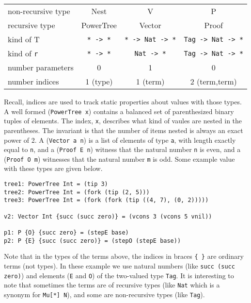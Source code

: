 \vspace*{0.1in}
\begin{tabular}{l|c|c|c}
non-recursive type & Nest          & V                    & P                       \\
recursive type     & PowerTree     & Vector               & Proof                   \\ \hline
kind of T          & \verb+* -> *+ & \verb+* -> Nat -> *+ & \verb+Tag -> Nat -> *+  \\ 
kind of \verb+r+   &  \verb+* -> *+ & \verb+Nat -> *+     & \verb+Tag -> Nat -> *+  \\
number parameters  & 0             & 1                    & 0                       \\ 
number indices     & 1 (type)      & 1 (term)             & 2 (term,term)           \\ 

\end{tabular}

\vspace*{0.1in}
Recall, indices are used to track static properties about values
with those types. A well formed (\verb+PowerTree x+) contains a balanced
set of parenthesized binary tuples of elements. The index, \verb+x+,  describes
what kind of vaules are nested in the parentheses. The invariant is that the
number of items nested is always an exact power of 2. A (\verb+Vector a n+) is a list of elements of
type \verb+a+, with length exactly equal to \verb+n+, and a (\verb+Proof E n+) witness that
the natural number \verb+n+ is even, and a (\verb+Proof O m+) witnesses
that the natural number \verb+m+ is odd. Some example value with these types are
given below.

{\small
\begin{verbatim}
tree1: PowerTree Int = (tip 3)
tree2: PowerTree Int = (fork (tip (2, 5)))
tree3: PowerTree Int = (fork (fork (tip ((4, 7), (0, 2)))))

v2: Vector Int {succ (succ zero)} = (vcons 3 (vcons 5 vnil))

p1: P {O} {succ zero} = (stepE base)
p2: P {E} {succ (succ zero)} = (stepO (stepE base))
\end{verbatim}}

Note that in the types of the terms above, the 
indices in braces \verb+{ }+ are ordinary terms (not types). In these example we use 
natural numbers (like \verb+succ (succ zero)+) and elements (\verb+E+ and \verb+O+)
of the two-valued type \verb+Tag+. It is interesting to note that sometimes the
terms are of recursive types (like \verb+Nat+ which is a synonym for \verb+Mu[*] N+),
and some are non-recursive types (like \verb+Tag+).


